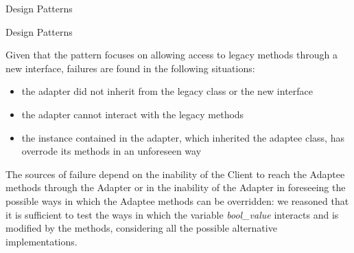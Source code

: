 \documentclass{beamer}
\begin{document}
\begin{section}{Design Patterns}
\begin{subsection}{Design Patterns}
\begin{frame}
{	Given that the pattern focuses on allowing access to legacy methods through a new interface, failures are found in the following situations:  
	\begin{itemize}
		\item the adapter did not inherit from the legacy class or the new interface
		\item the adapter cannot interact with the legacy methods 
		\item the instance contained in the adapter, which inherited the adaptee class, has overrode its methods in an unforeseen way
	\end{itemize}
\vspace{5mm}
	The sources of failure depend on the inability of the Client to reach the Adaptee methods through the Adapter or in the inability of the Adapter in foreseeing the possible ways in which the Adaptee methods can be overridden:  we reasoned that it is sufficient to test the ways in which the variable \textit{bool\_value} interacts and is modified by the methods, considering all the possible alternative implementations. 

}
			

\end{frame}
\end{subsection}
\end{section}
\end{document}

